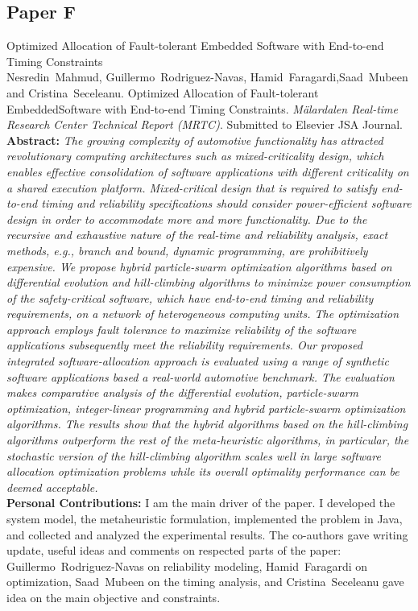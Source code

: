 \subsection*{Paper F}
Optimized Allocation of Fault-tolerant Embedded Software with End-to-end Timing Constraints\\[6pt]
Nesredin~Mahmud, Guillermo~Rodriguez-Navas, Hamid~Faragardi,Saad~Mubeen and Cristina~Seceleanu. Optimized Allocation of Fault-tolerant EmbeddedSoftware with End-to-end Timing Constraints. \textit{M\"{a}lardalen Real-time Research Center Technical Report (MRTC)}. Submitted to Elsevier JSA Journal. \label{lbl_softwareallocation_pso}\\[6pt]%
\textbf{Abstract:} \textit{The growing complexity of automotive functionality has attracted revolutionary computing architectures such as mixed-criticality design, which enables effective consolidation of software applications with different criticality on a shared execution platform. Mixed-critical design that is required to satisfy end-to-end timing and reliability specifications should consider power-efficient software design in order to accommodate more and more functionality. Due to the recursive and exhaustive nature of the real-time and reliability analysis, exact methods, e.g., branch and bound, dynamic programming, are prohibitively expensive. We propose hybrid particle-swarm optimization algorithms based on differential evolution and hill-climbing algorithms to minimize power consumption of the safety-critical software, which have end-to-end timing and reliability requirements, on a network of heterogeneous computing units. The optimization approach employs fault tolerance to maximize reliability of the software applications subsequently meet the reliability requirements. Our proposed integrated software-allocation approach is evaluated using a range of synthetic software applications based a real-world automotive benchmark. The evaluation makes comparative analysis of the differential evolution, particle-swarm optimization, integer-linear programming and hybrid particle-swarm optimization algorithms. The results show that the hybrid algorithms based on the hill-climbing algorithms outperform the rest of the meta-heuristic algorithms, in particular, the stochastic version of the hill-climbing algorithm scales well in large software allocation optimization problems while its overall optimality performance can be deemed acceptable.
}\\[6pt]%
\textbf{Personal Contributions: } I am the main driver of the paper. I developed the system model, the metaheuristic formulation, implemented the problem in Java, and collected and analyzed the experimental results. The co-authors gave writing update, useful ideas and comments on respected parts of the paper: Guillermo~Rodriguez-Navas on reliability modeling, Hamid~Faragardi on optimization, Saad~Mubeen on the timing analysis, and Cristina~Seceleanu gave idea on the main objective and constraints. \\%
